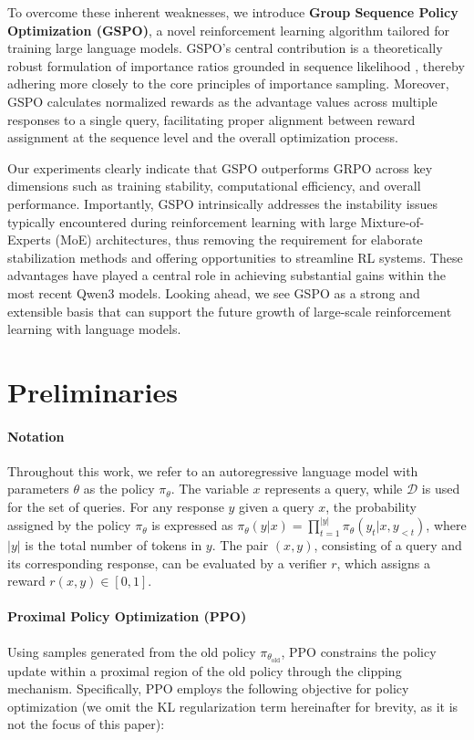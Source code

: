 To overcome these inherent weaknesses, we introduce \textbf{Group Sequence Policy Optimization (GSPO)}, a novel reinforcement learning algorithm tailored for training large language models. GSPO's central contribution is a theoretically robust formulation of importance ratios grounded in sequence likelihood \citep{click}, thereby adhering more closely to the core principles of importance sampling. Moreover, GSPO calculates normalized rewards as the advantage values across multiple responses to a single query, facilitating proper alignment between reward assignment at the sequence level and the overall optimization process.

Our experiments clearly indicate that GSPO outperforms GRPO across key dimensions such as training stability, computational efficiency, and overall performance. Importantly, GSPO intrinsically addresses the instability issues typically encountered during reinforcement learning with large Mixture-of-Experts (MoE) architectures, thus removing the requirement for elaborate stabilization methods and offering opportunities to streamline RL systems. These advantages have played a central role in achieving substantial gains within the most recent Qwen3 models. Looking ahead, we see GSPO as a strong and extensible basis that can support the future growth of large-scale reinforcement learning with language models.

\section{Preliminaries}

\paragraph{Notation}
Throughout this work, we refer to an autoregressive language model with parameters $\theta$ as the policy $\pi_\theta$. The variable $x$ represents a query, while $\mathcal{D}$ is used for the set of queries. For any response $y$ given a query $x$, the probability assigned by the policy $\pi_\theta$ is expressed as $\pi_\theta (y | x) = \prod_{t=1}^{|y|} \pi_\theta (y_t | x, y_{<t})$, where $|y|$ is the total number of tokens in $y$. The pair $(x, y)$, consisting of a query and its corresponding response, can be evaluated by a verifier $r$, which assigns a reward $r(x, y) \in [ 0, 1 ]$.

\paragraph{Proximal Policy Optimization (PPO)} Using samples generated from the old policy $\pi_{\theta_\text{old}}$, PPO \citep{ppo} constrains the policy update within a proximal region of the old policy through the clipping mechanism. Specifically, PPO employs the following objective for policy optimization (we omit the KL regularization term hereinafter for brevity, as it is not the focus of this paper):

